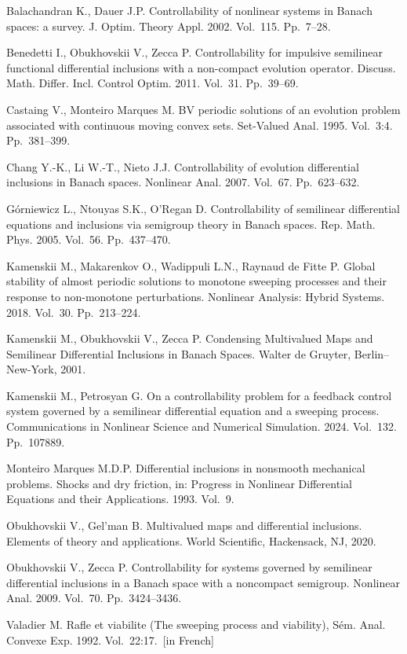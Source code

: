 \documentclass[12pt]{llncs}
\begin{document}
\begin{thebibliography}{9} %


 Balachandran K., Dauer J.P. Controllability of nonlinear systems in Banach spaces: a survey. J. Optim. Theory Appl. 2002. Vol.~115. Pp.~7--28.


 Benedetti I., Obukhovskii V., Zecca P. Controllability for impulsive semilinear functional differential inclusions with a non-compact evolution operator. Discuss. Math. Differ. Incl. Control Optim. 2011. Vol.~31. Pp.~39--69.

 Castaing V., Monteiro Marques M. BV periodic solutions of an evolution problem associated with continuous moving convex sets. Set-Valued Anal. 1995. Vol.~3:4. Pp.~381--399.


 Chang Y.-K., Li W.-T., Nieto J.J. Controllability of evolution differential inclusions in Banach spaces. Nonlinear Anal. 2007. Vol.~67. Pp.~623--632.


 G\'orniewicz L., Ntouyas S.K., O'Regan D. Controllability of semilinear differential equations and inclusions via semigroup theory in Banach spaces. Rep. Math. Phys. 2005. Vol.~56. Pp.~437--470.



 Kamenskii M., Makarenkov O., Wadippuli L.N., Raynaud de Fitte P. Global stability of almost periodic solutions to monotone sweeping processes and their response to non-monotone perturbations. Nonlinear Analysis: Hybrid Systems. 2018. Vol.~30. Pp.~213--224.

 Kamenskii M., Obukhovskii V., Zecca P. Condensing Multivalued Maps and Semilinear Differential Inclusions in Banach Spaces. Walter de Gruyter, Berlin--New-York, 2001.

	Kamenskii M., Petrosyan G. On a controllability problem for a feedback control system governed by a semilinear differential equation and a sweeping process. Communications in Nonlinear Science and Numerical Simulation. 2024. Vol.~132. Pp.~107889.


 Monteiro Marques M.D.P. Differential inclusions in nonsmooth mechanical problems. Shocks and dry friction, in: Progress in Nonlinear Differential Equations and their Applications. 1993. Vol.~9.

 Obukhovskii V., Gel'man B. Multivalued maps and differential inclusions. Elements of theory and applications. World Scientific, Hackensack, NJ, 2020.

 Obukhovskii V., Zecca P. Controllability for systems governed by semilinear differential inclusions in a Banach space with a noncompact semigroup. Nonlinear Anal. 2009. Vol.~70. Pp.~3424--3436.

 Valadier M. Rafle et viabilite (The sweeping process and viability), Sém. Anal. Convexe Exp. 1992. Vol.~22:17.~[in French]

\end{thebibliography}
\end{document}
